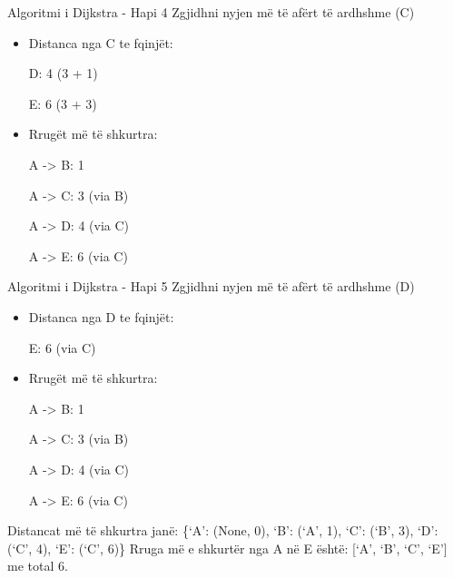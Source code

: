 \documentclass[
  ignorenonframetext,
]{beamer}
\begin{document}
\begin{frame}{Algoritmi i Dijkstra - Hapi 4}
\protect\hypertarget{algoritmi-i-dijkstra---hapi-4}{}
Zgjidhni nyjen më të afërt të ardhshme (C)

\begin{itemize}
\item
  Distanca nga C te fqinjët:

  D: 4 (3 + 1)

  E: 6 (3 + 3)
\item
  Rrugët më të shkurtra:

  A -\textgreater{} B: 1

  A -\textgreater{} C: 3 (via B)

  A -\textgreater{} D: 4 (via C)

  A -\textgreater{} E: 6 (via C)
\end{itemize}
\end{frame}

\begin{frame}{Algoritmi i Dijkstra - Hapi 5}
\protect\hypertarget{algoritmi-i-dijkstra---hapi-5}{}
Zgjidhni nyjen më të afërt të ardhshme (D)

\begin{itemize}
\item
  Distanca nga D te fqinjët:

  E: 6 (via C)
\item
  Rrugët më të shkurtra:

  A -\textgreater{} B: 1

  A -\textgreater{} C: 3 (via B)

  A -\textgreater{} D: 4 (via C)

  A -\textgreater{} E: 6 (via C)
\end{itemize}

Distancat më të shkurtra janë: \{`A': (None, 0), `B': (`A', 1), `C':
(`B', 3), `D': (`C', 4), `E': (`C', 6)\} Rruga më e shkurtër nga A në E
është: {[}`A', `B', `C', `E'{]} me total 6.
\end{frame}
\end{document}
